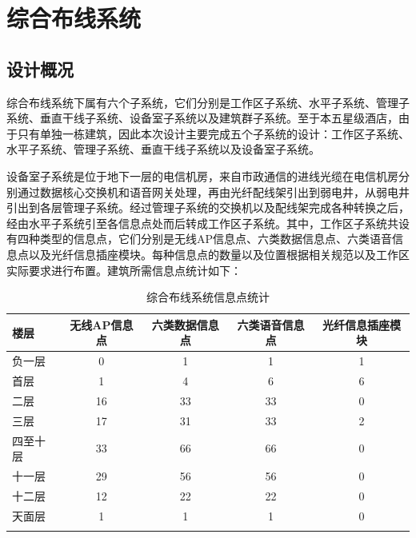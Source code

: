 \documentclass{gdutart}
\begin{document}
  \section{综合布线系统}
    \subsection{设计概况}
    综合布线系统下属有六个子系统，它们分别是工作区子系统、水平子系统、管理子系统、垂直干线子系统、设备室子系统以及建筑群子系统。至于本五星级酒店，由于只有单独一栋建筑，因此本次设计主要完成五个子系统的设计：工作区子系统、水平子系统、管理子系统、垂直干线子系统以及设备室子系统。

    设备室子系统是位于地下一层的电信机房，来自市政通信的进线光缆在电信机房分别通过数据核心交换机和语音网关处理，再由光纤配线架引出到弱电井，从弱电井引出到各层管理子系统。经过管理子系统的交换机以及配线架完成各种转换之后，经由水平子系统引至各信息点处而后转成工作区子系统。其中，工作区子系统共设有四种类型的信息点，它们分别是无线AP信息点、六类数据信息点、六类语音信息点以及光纤信息插座模块。每种信息点的数量以及位置根据相关规范以及工作区实际要求进行布置。建筑所需信息点统计如下：

    \begin{table}[htpb]
      \begin{center}
        \caption{综合布线系统信息点统计}\label{tab:tab13}
        \begin{tabularx}{\linewidth}{>{\centering}p{4em}|c|c|c|c}
          \Xhline{1.5pt}
          楼层 & 无线AP信息点 & 六类数据信息点 & 六类语音信息点 & 光纤信息插座模块 \\
          \hline
          负一层 & 0 & 1 & 1 & 1 \\
          \hline
          首层 & 1 & 4 & 6 & 6 \\
          \hline
          二层 & 16 & 33 & 33 & 0 \\
          \hline
          三层 & 17 & 31 & 33 & 2 \\
          \hline
          四至十层 & 33 & 66 & 66 & 0 \\
          \hline
          十一层 & 29 & 56 & 56 & 0 \\
          \hline
          十二层 & 12 & 22 & 22 & 0 \\
          \hline
          天面层 & 1 & 1 & 1 & 0 \\
          \Xhline{1.5pt}
        \end{tabularx}
      \end{center}
    \end{table}
\end{document}
